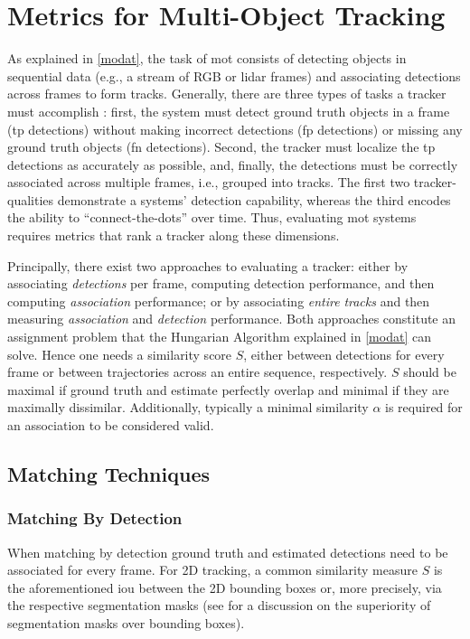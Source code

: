 \documentclass[headsepline, hidelinks, footsepline, footinclude=false, oneside, fontsize=11pt, paper=a4, listof=totoc, bibliography=totoc]{scrbook}
\begin{document}
\section{Metrics for Multi-Object Tracking \label{mot-metrics}}
\label{sec:orged37c62}
   As explained in \cref{modat}, the task of \gls{mot} consists of detecting objects in sequential data (e.g., a stream of RGB or \gls{lidar} frames) and associating detections across frames to form tracks.
Generally, there are three types of tasks a tracker must accomplish \cite{leichterMonotonicityErrorType2013}: 
first, the system must detect ground truth objects in a frame (\gls{tp} detections) without making incorrect detections (\gls{fp} detections) or missing any ground truth objects (\gls{fn} detections).
Second, the tracker must localize the \gls{tp} detections as accurately as possible, and, finally, the detections must be correctly associated across multiple frames, i.e., grouped into tracks.
The first two tracker-qualities demonstrate a systems' detection capability, whereas the third encodes the ability to ``connect-the-dots'' over time.
Thus, evaluating \gls{mot} systems requires metrics that rank a tracker along these dimensions.

Principally, there exist two approaches to evaluating a tracker: either by associating \emph{detections} per frame, computing detection performance, and then computing \emph{association} performance; 
or by associating \emph{entire} \emph{tracks} and then measuring \emph{association} and \emph{detection} performance.
Both approaches constitute an assignment problem that the Hungarian Algorithm explained in \cref{modat} can solve. 
Hence one needs a similarity score \(S\), either between detections for every frame or between trajectories across an entire sequence, respectively. 
\(S\) should be maximal if ground truth and estimate perfectly overlap and minimal if they are maximally dissimilar.
Additionally, typically a minimal similarity \(\alpha\) is required for an association to be considered valid.


\subsection{Matching Techniques}
\label{sec:org8f6ab2c}
\subsubsection{Matching By Detection \label{matching-by-detection}}
\label{sec:org8b2dbe7}
    When matching by detection ground truth and estimated detections need to be associated for every frame. 
For 2D tracking, a common similarity measure \(S\) is the aforementioned \gls{iou} between the 2D bounding boxes or, more precisely, via the respective segmentation masks 
(see \cite{voigtlaenderMOTSMultiObjectTracking2019} for a discussion on the superiority of segmentation masks over bounding boxes).
\end{document}
